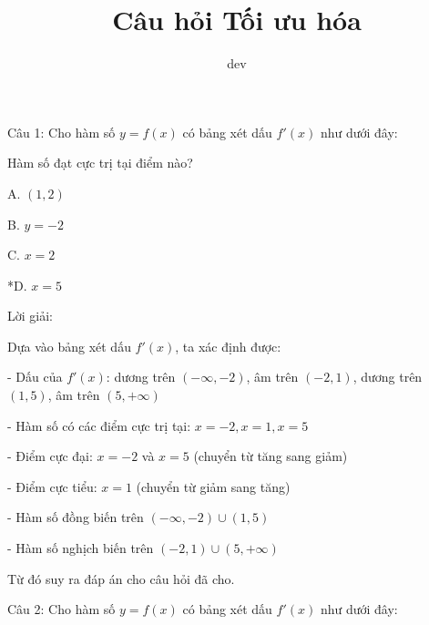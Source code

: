 \documentclass[a4paper,12pt]{article}
\begin{document}
\title{Câu hỏi Tối ưu hóa}
\author{dev}
\maketitle

Câu 1: Cho hàm số \(y=f(x)\) có bảng xét dấu \(f'(x)\) như dưới đây:


Hàm số đạt cực trị tại điểm nào?

A. \((1,2)\)

B. \(y=-2\)

C. \(x=2\)

*D. \(x=5\)

Lời giải:


Dựa vào bảng xét dấu \(f'(x)\), ta xác định được:

- Dấu của \(f'(x)\): dương trên \((-\infty, -2)\), âm trên \((-2, 1)\), dương trên \((1, 5)\), âm trên \((5, +\infty)\)

- Hàm số có các điểm cực trị tại: \(x = -2, x = 1, x = 5\)

- Điểm cực đại: \(x = -2\) và \(x = 5\) (chuyển từ tăng sang giảm)

- Điểm cực tiểu: \(x = 1\) (chuyển từ giảm sang tăng)

- Hàm số đồng biến trên \((-\infty, -2) \cup (1, 5)\)

- Hàm số nghịch biến trên \((-2, 1) \cup (5, +\infty)\)

Từ đó suy ra đáp án cho câu hỏi đã cho.




Câu 2: Cho hàm số \(y=f(x)\) có bảng xét dấu \(f'(x)\) như dưới đây:

\end{document}
